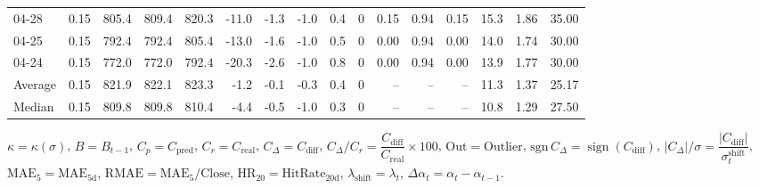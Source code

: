 \begin{threeparttable}
{\begin{tabular}{lrrrrrrrrrrrrrrr}
  04-28 &     0.15 & 805.4 & 809.4 & 820.3 &      -11.0 &           -1.3 &                     -1.0 &                 0.4 &              0 &       0.15 &      0.94 &           0.15 &             15.3 &            1.86 &                  35.00 \\
  04-25 &     0.15 & 792.4 & 792.4 & 805.4 &      -13.0 &           -1.6 &                     -1.0 &                 0.5 &              0 &       0.00 &      0.94 &           0.00 &             14.0 &            1.74 &                  30.00 \\
  04-24 &     0.15 & 772.0 & 772.0 & 792.4 &      -20.3 &           -2.6 &                     -1.0 &                 0.8 &              0 &       0.00 &      0.94 &           0.00 &             13.9 &            1.77 &                  30.00 \\
Average &     0.15 & 821.9 & 822.1 & 823.3 &       -1.2 &           -0.1 &                     -0.3 &                 0.4 &              0 &         -- &        -- &             -- &             11.3 &            1.37 &                  25.17 \\
 Median &     0.15 & 809.8 & 809.8 & 810.4 &       -4.4 &           -0.5 &                     -1.0 &                 0.3 &              0 &         -- &        -- &             -- &             10.8 &            1.29 &                  27.50 \\
\bottomrule
\end{tabular}
}
\begin{tablenotes}\footnotesize
\item $\kappa=\kappa(\sigma)$, $B=B_{t-1}$, $C_p=C_{\text{pred}}$, $C_r=C_{\text{real}}$, $C_\Delta=C_{\text{diff}}$, $C_\Delta/C_r=\dfrac{C_{\text{diff}}}{C_{\text{real}}}\times100$, $\mathrm{Out}=\text{Outlier}$, $\mathrm{sgn}\,C_\Delta=\operatorname{sign}(C_{\text{diff}})$, $|C_\Delta|/\sigma=\dfrac{|C_{\text{diff}}|}{\sigma_t^{\text{shift}}}$, $\mathrm{MAE}_5=\mathrm{MAE}_{5\text{d}}$, $\mathrm{RMAE}= \mathrm{MAE}_5 / \text{Close}$, $\mathrm{HR}_{20}=\mathrm{HitRate}_{20\text{d}}$, 
$\lambda_{\text{shift}}=\lambda_t$, 
$\Delta\alpha_t=\alpha_t-\alpha_{t-1}$.
\end{tablenotes}
\end{threeparttable}
\endgroup

